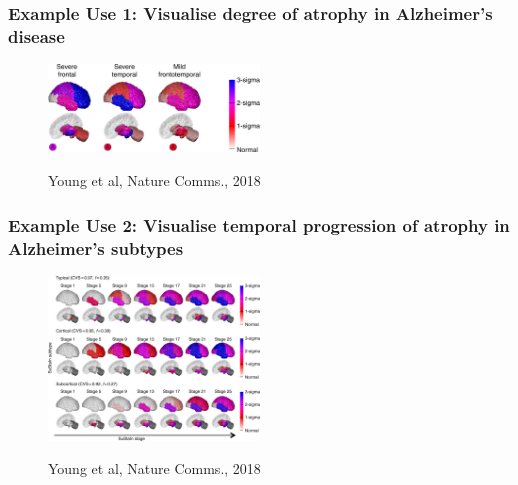 \documentclass[10pt,xcolor=table,aspectratio=169]{beamer}
\begin{document}
\begin{frame}
 \frametitle{Example Use 1: Visualise degree of atrophy in Alzheimer's disease}
 
\begin{figure}
\centering
 \includegraphics[width=0.5\textwidth]{images/young_3brains.png}
 
 Young et al, Nature Comms., 2018
\end{figure}
 
\end{frame}

\begin{frame}
 \frametitle{Example Use 2: Visualise temporal progression of atrophy in Alzheimer's subtypes}

 \begin{figure}
\centering
 \includegraphics[width=0.5\textwidth]{images/young_progression.png}
 
 Young et al, Nature Comms., 2018
\end{figure}
 
\end{frame}
\end{document}
